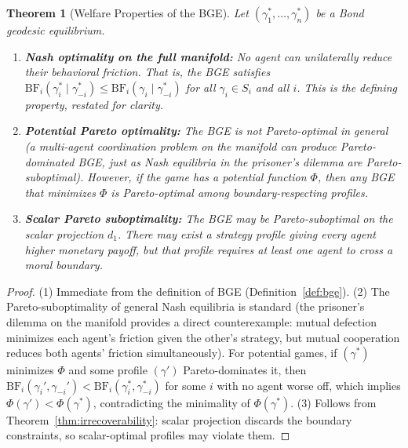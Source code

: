 \documentclass[12pt]{article}
\newtheorem{theorem}{Theorem}[section]
\theoremstyle{definition}
\theoremstyle{remark}
\newcommand{\BF}{\mathrm{BF}}              %
\begin{document}
\begin{theorem}[Welfare Properties of the BGE]
\label{thm:welfare}
Let $(\gamma_1^*, \ldots, \gamma_n^*)$ be a Bond geodesic equilibrium.
\begin{enumerate}
    \item \textbf{Nash optimality on the full manifold:} No agent can unilaterally reduce their behavioral friction.  That is, the BGE satisfies $\BF_i(\gamma_i^* \mid \gamma_{-i}^*) \leq \BF_i(\gamma_i \mid \gamma_{-i}^*)$ for all $\gamma_i \in S_i$ and all $i$.  This is the defining property, restated for clarity.
    \item \textbf{Potential Pareto optimality:} The BGE is not Pareto-optimal in general (a multi-agent coordination problem on the manifold can produce Pareto-dominated BGE, just as Nash equilibria in the prisoner's dilemma are Pareto-suboptimal).  However, if the game has a \emph{potential function} $\Phi$, then any BGE that minimizes $\Phi$ is Pareto-optimal among boundary-respecting profiles.
    \item \textbf{Scalar Pareto suboptimality:} The BGE may be Pareto-suboptimal on the scalar projection $d_1$.  There may exist a strategy profile giving every agent higher monetary payoff, but that profile requires at least one agent to cross a moral boundary.
\end{enumerate}
\end{theorem}

\begin{proof}
(1) Immediate from the definition of BGE (Definition~\ref{def:bge}).  (2) The Pareto-suboptimality of general Nash equilibria is standard (the prisoner's dilemma on the manifold provides a direct counterexample: mutual defection minimizes each agent's friction given the other's strategy, but mutual cooperation reduces both agents' friction simultaneously).  For potential games, if $(\gamma^*)$ minimizes $\Phi$ and some profile $(\gamma')$ Pareto-dominates it, then $\BF_i(\gamma_i', \gamma_{-i}') < \BF_i(\gamma_i^*, \gamma_{-i}^*)$ for some $i$ with no agent worse off, which implies $\Phi(\gamma') < \Phi(\gamma^*)$, contradicting the minimality of $\Phi(\gamma^*)$.  (3) Follows from Theorem~\ref{thm:irrecoverability}: scalar projection discards the boundary constraints, so scalar-optimal profiles may violate them.
\end{proof}
\end{document}
